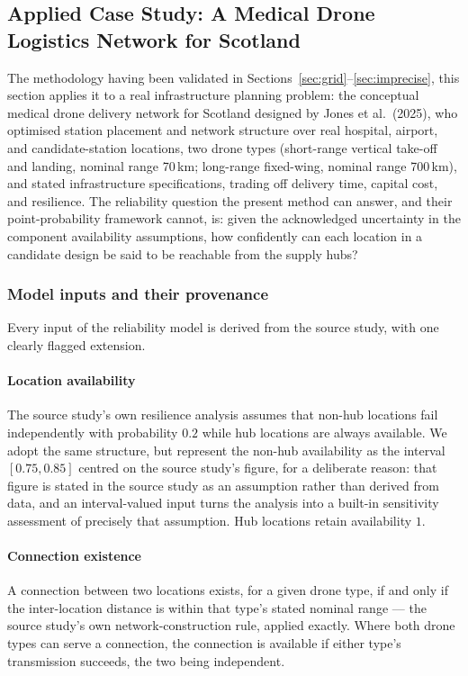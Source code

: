 \documentclass[preprint,12pt]{elsarticle}
\theoremstyle{definition}
\begin{document}
\subsection{Applied Case Study: A Medical Drone Logistics Network for Scotland}\label{sec:drone}

The methodology having been validated in Sections~\ref{sec:grid}--\ref{sec:imprecise}, this section
applies it to a real infrastructure planning problem: the conceptual medical drone delivery network for
Scotland designed by Jones et al.\ (2025), who optimised station placement and network structure over
real hospital, airport, and candidate-station locations, two drone types (short-range vertical take-off
and landing, nominal range 70\,km; long-range fixed-wing, nominal range 700\,km), and stated
infrastructure specifications, trading off delivery time, capital cost, and resilience. The reliability
question the present method can answer, and their point-probability framework cannot, is: given the
acknowledged uncertainty in the component availability assumptions, how confidently can each location in
a candidate design be said to be reachable from the supply hubs?

\subsubsection{Model inputs and their provenance}\label{sec:provenance}

Every input of the reliability model is derived from the source study, with one clearly flagged
extension.

\paragraph{Location availability} The source study's own resilience analysis assumes that non-hub
locations fail independently with probability $0.2$ while hub locations are always available. We adopt
the same structure, but represent the non-hub availability as the interval $[0.75,0.85]$ centred on the
source study's figure, for a deliberate reason: that figure is stated in the source study as an
assumption rather than derived from data, and an interval-valued input turns the analysis into a
built-in sensitivity assessment of precisely that assumption. Hub locations retain availability $1$.

\paragraph{Connection existence} A connection between two locations exists, for a given drone type, if
and only if the inter-location distance is within that type's stated nominal range --- the source
study's own network-construction rule, applied exactly. Where both drone types can serve a connection,
the connection is available if either type's transmission succeeds, the two being independent.
\end{document}
